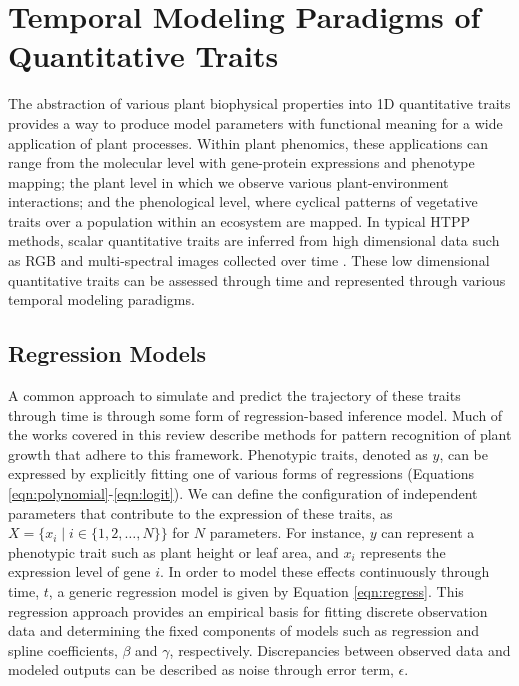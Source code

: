 \documentclass{article}
\begin{document}
\section{Temporal Modeling Paradigms of Quantitative Traits}
\label{sec:modeling_paradigm}
The abstraction of various plant biophysical properties into 1D quantitative traits provides a way to produce model parameters with functional meaning for a wide application of plant processes. Within plant phenomics, these applications can range from the molecular level with gene-protein expressions and phenotype mapping; the plant level in which we observe various plant-environment interactions; and the phenological level, where cyclical patterns of vegetative traits over a population within an ecosystem are mapped. In typical HTPP methods, scalar quantitative traits are inferred from high dimensional data such as RGB and multi-spectral images collected over time \cite{GE2016625,anche2023scalable,anche2020temporal,sun2018field}. These low dimensional quantitative traits can be assessed through time and represented through various temporal modeling paradigms.

\subsection{Regression Models}

A common approach to simulate and predict the trajectory of these traits through time is through some form of regression-based inference model. Much of the works covered in this review describe methods for pattern recognition of plant growth that adhere to this framework. Phenotypic traits, denoted as $y$, can be expressed by explicitly fitting one of various forms of regressions (Equations \ref{eqn:polynomial}-\ref{eqn:logit}). We can define the configuration of independent parameters that contribute to the expression of these traits, as $X = \{ x_i \mid i \in \{1,2, \ldots, N\}\}$ for $N$ parameters. For instance, $y$ can represent a phenotypic trait such as plant height or leaf area, and $x_i$ represents the expression level of gene $i$. In order to model these effects continuously through time, $t$, a generic regression model is given by Equation \ref{eqn:regress}. This regression approach provides an empirical basis for fitting discrete observation data and determining the fixed components of models such as regression and spline coefficients, $\beta$ and $\gamma$, respectively. Discrepancies between observed data and modeled outputs can be described as noise through error term, $\epsilon$.
\end{document}

